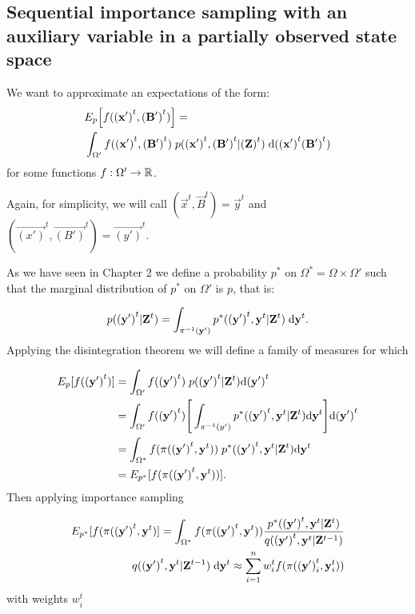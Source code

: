 \subsection{Sequential importance sampling with an auxiliary variable in a partially observed state space}
\label{sec:5}

We want to approximate an expectations of the form:
\begin{align*}
    &E_{p} \Big[f(\mathbf{(x')}^{t}, \mathbf{(B')}^{t}) \Big] = \\ &\int_{\Omega'} f(\mathbf{(x')}^{t}, \mathbf{(B')}^{t})\; p(\mathbf{(x')}^{t}, \mathbf{(B')}^{t} | \mathbf{(Z)}^{t})\; \mathrm{d} (\mathbf{(x')}^{t}\mathbf{(B')}^{t}) 
\end{align*}
for some functions $f: \Omega'  \rightarrow \mathbb R$. 

Again, for simplicity, we will call $(\vec{x}^{t}, \vec{B}^{t}) = \vec{y}^{t}$ and $(\vec{(x')}^{t}, \vec{(B')}^{t}) = \vec{(y')}^{t}$.

As we have seen in Chapter 2 we define a probability $p^*$ on $\Omega^* = \Omega \times \Omega'$ such that the marginal distribution of $p^*$ on $\Omega'$ is $p$, that is:

\begin{equation*}
    p(\mathbf{(y')}^t | \mathbf{Z}^t) = \int_{\pi^{-1}(\mathbf{y'})} p^*(\mathbf{(y')}^t, \mathbf{y}^t | \mathbf{Z}^t)\; \mathrm{d} \mathbf{y}^t.
\end{equation*}
Applying the disintegration theorem we will define a family of measures for which

\begin{align*}
    E_{p}[f(\mathbf{(y')}^{t})]  &= \int_{\Omega'} f(\mathbf{(y')}^{t})\; p(\mathbf{(y')}^{t} | \mathbf{Z}^{t}) \mathrm{d} \mathbf{(y')}^{t} \\
    &= \int_{\Omega'} f(\mathbf{(y')}^{t})\Bigg[\int_{\pi^{-1}(y')} p^*(\mathbf{(y')}^{t}, \mathbf{y}^{t} | \mathbf{Z}^{t}) \mathrm{d} \mathbf{y}^{t}\Bigg] \mathrm{d} \mathbf{(y')}^{t} \\ 
    &= \int_{\Omega^*} f(\pi(\mathbf{(y')}^{t}, \mathbf{y}^{t}))\; p^*(\mathbf{(y')}^{t}, \mathbf{y}^{t} | \mathbf{Z}^{t}) \mathrm{d} \mathbf{y}^{t} \\ 
    &= E_{p^*}[f(\pi (\mathbf{(y')}^{t}, \mathbf{y}^{t}))].
\end{align*}
Then applying importance sampling

\begin{align*}
    E_{p^*}[f(\pi (\mathbf{(y')}^{t}, \mathbf{y}^{t})] = \int_{\Omega^*} f(\pi(\mathbf{(y')}^{t}, \mathbf{y}^{t})) \frac{p^*(\mathbf{(y')}^{t}, \mathbf{y}^{t}|\mathbf{Z}^{t})} {q(\mathbf{(y')}^{t}, \mathbf{y}^{t} | \mathbf{Z}^{t-1})} \\
    q(\mathbf{(y')}^{t}, \mathbf{y}^{t} | \mathbf{Z}^{t-1}) \; \mathrm{d} \mathbf{y}^{t} \approx \sum_{i=1}^n  w^{t}_i f(\pi (\mathbf{(y')}^{t}_i, \mathbf{y}^{t}_i))
\end{align*}
with weights $w^{t}_i$

